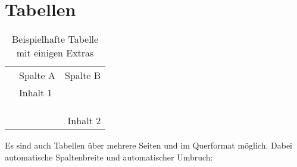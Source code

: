 
\chapter{Tabellen}

\begin{table}[H]
    \centering
    \small
    \caption{Beispielhafte Tabelle mit einigen Extras}
    \label{tab:tabelle}
    \vspace{12pt}
    \begin{tabularx}{.85\textwidth}{|c|Xr|}
        \cline{2-3}
        \multicolumn{1}{l|}{} & Spalte A & Spalte B \\ \cline{2-3}\noalign{\vskip\doublerulesep\vskip-\arrayrulewidth} \hline 
        \parbox[t]{2mm}{} 
        & Inhalt 1 & \\
        & & \\
        & & \\ \hline \hline 
        \parbox[t]{2mm}{} 
        & & \\
        & & Inhalt 2 \\ \hline
    \end{tabularx}
\end{table} 

Es sind auch Tabellen über mehrere Seiten und im Querformat möglich. Dabei automatische Spaltenbreite und automatischer Umbruch:
\begin{landscape}
\end{landscape}